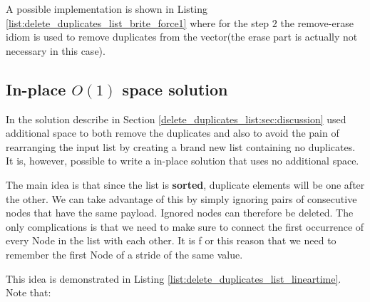 A possible implementation is shown in Listing \ref{list:delete_duplicates_list_brite_force1} where for the step $2$ the  remove-erase idiom\cite{cit::wiki::remove-erase} is used to remove duplicates from the vector(the erase part is actually not necessary in this case).




\subsection{In-place $O(1)$ space solution}
\label{delete_duplicates_list:sec:linear_space}
In the solution describe in Section \ref{delete_duplicates_list:sec:discussion} used additional space to both remove the duplicates and also to avoid the pain of rearranging the input list by creating a brand new list containing no duplicates. It is, however,  possible to write a in-place solution that uses no additional space. 

The main idea is that since the list is \textbf{sorted}, duplicate elements will be one after the other. We can take advantage of this by simply ignoring pairs of consecutive nodes that have the same payload. Ignored nodes can therefore be deleted. The only complications is that we need to make sure to connect the first occurrence of every Node in the list with each other. It is f or this reason that we need to remember the first Node of a stride of the same value.

This idea is demonstrated in Listing \ref{list:delete_duplicates_list_lineartime}. Note that:


